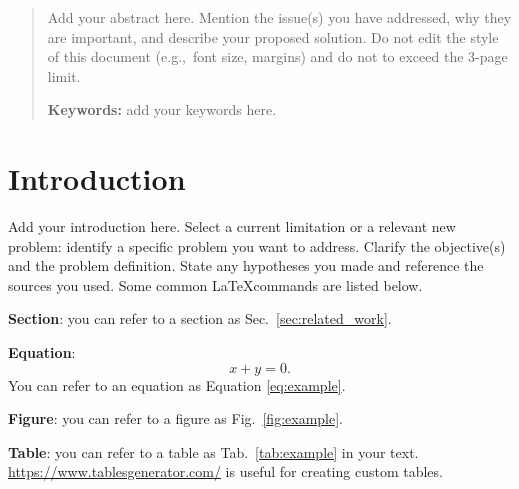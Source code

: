 \documentclass{article}
\begin{document}

\printAffiliationsAndNotice{} 

\begin{abstract}
Add your abstract here. Mention the issue(s) you have addressed, why they are important, and describe your proposed solution. Do not edit the style of this document (e.g.,~font size, margins) and do not to exceed the 3-page limit. 

\textbf{Keywords:} add your keywords here.

\end{abstract}
\section{Introduction}
\label{sec:intro}

Add your introduction here. Select a current limitation or a relevant new problem: identify a specific problem you want to address. Clarify the objective(s) and the problem definition. State any hypotheses you made and reference the sources you used. Some common \LaTeX commands are listed below. 

\textbf{Section}: you can refer to a section as Sec.~\ref{sec:related_work}.
    
\textbf{Equation}: 
    \begin{equation} \label{eq:example}
    x + y = 0.
    \end{equation}
    You can refer to an equation as Equation \ref{eq:example}.

\textbf{Figure}: you can refer to a figure as Fig.~\ref{fig:example}. 

\textbf{Table}: you can refer to a table as Tab.~\ref{tab:example} in your text. \url{https://www.tablesgenerator.com/} is useful for creating custom tables.
   
\end{document}
